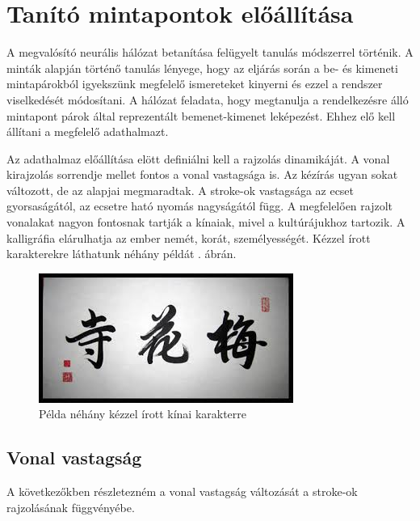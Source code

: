
\section{Tanító mintapontok előállítása}

A megvalósító neurális hálózat betanítása felügyelt tanulás módszerrel történik. A minták alapján történő tanulás lényege, hogy az eljárás során a be- és kimeneti mintapárokból igyekszünk megfelelő ismereteket kinyerni és ezzel a rendszer viselkedését módosítani. A hálózat feladata, hogy megtanulja a rendelkezésre álló mintapont párok által reprezentált bemenet-kimenet leképezést. Ehhez elő kell állítani a megfelelő adathalmazt.

Az adathalmaz előállítása elött definiálni kell a rajzolás dinamikáját. A vonal kirajzolás sorrendje mellet fontos a vonal vastagsága is. Az kézírás ugyan sokat változott, de az alapjai megmaradtak. A stroke-ok vastagsága az ecset gyorsaságától, az ecsetre ható nyomás nagyságától függ. A megfelelően rajzolt vonalakat nagyon fontosnak tartják a kínaiak, mivel a kultúrájukhoz tartozik. A kalligráfia elárulhatja az ember nemét, korát, személyességét. Kézzel írott karakterekre láthatunk néhány példát . ábrán.

\begin{figure}[h]
\centering
\includegraphics[scale=0.8]{images/calligraphy}
\caption{Példa néhány kézzel írott kínai karakterre}
\label{fig:calligraphy}
\end{figure}

\subsection{Vonal vastagság}

A következőkben részletezném a vonal vastagság változását a stroke\cite{StrokeCJ9}-ok rajzolásának függvényébe. 

